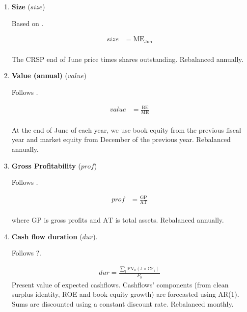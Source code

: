\begin{enumerate}
	\item \textbf{Size} ($size$)
	
	Based on .
	
	\begin{align*}
		size &= \mathrm{ME}_{\text{Jun}} \\
	\end{align*}
	
	The CRSP end of June price times shares outstanding. Rebalanced annually. 


	
	\item \textbf{Value (annual)} ($value$)
	
	Follows . 
	
	\begin{align*}
		value &= \frac { \mathrm{BE} }{ \mathrm{ME} } \\
	\end{align*}

	 At the end of June of each year, we use book equity from the previous fiscal year and market equity from December of the previous year. Rebalanced annually.



	\item \textbf{Gross Profitability} ($prof$)
	
	Follows . 
	
	\begin{align*}
		prof &= \frac{ \mathrm{GP} }{ \mathrm{AT} } \\
	\end{align*}
	
	where $\mathrm{GP}$ is gross profits and $\mathrm{AT}$ is total assets. Rebalanced annually.
	
	
	
	\item \textbf{Cash flow duration} ($dur$). 
	
	Follows ?. 
	
	\begin{align*}
		dur = \frac{ \sum_t \mathrm{PV}_0 \left( t \times \mathrm{CF}_t \right) }{ P_0 }
	\end{align*}
	Present value of expected cashflows. Cashflows' components (from clean surplus identity, ROE and book equity growth) are forecasted using AR(1). Sums are discounted using a constant discount rate. Rebalanced monthly.
	
		
	

\end{enumerate}
